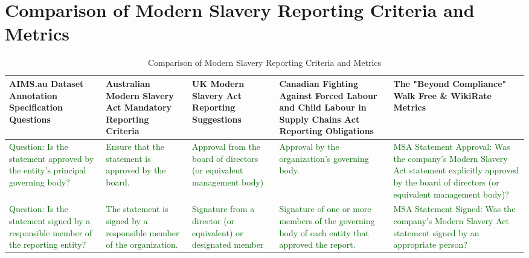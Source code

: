 

\section{Comparison of Modern Slavery Reporting Criteria and Metrics}

\begin{landscape}
\begin{table}
\centering
\caption{Comparison of Modern Slavery Reporting Criteria and Metrics}
\vspace{0.1mm}
\fontsize{7}{7}\selectfont
\label{tab:appendix:examples}
\begin{adjustbox}{scale=0.93}
    \begin{tabularx}{26cm}{|X|X|X|X|X|}
    \hline  %
         \textbf{AIMS.au Dataset Annotation Specification Questions} & \textbf{Australian Modern Slavery Act Mandatory Reporting Criteria} & \textbf{UK Modern Slavery Act Reporting Suggestions} & \textbf{Canadian Fighting Against Forced Labour and Child Labour in Supply Chains Act Reporting Obligations} & \textbf{The "Beyond Compliance" Walk Free \& WikiRate Metrics} \\
    \hline  %

      \textcolor{darkgreen}{  Question: Is the statement approved by the entity's principal governing body?} & \textcolor{darkgreen}{Ensure that the statement is approved by the board.} & \textcolor{darkgreen}{Approval from the board of directors (or equivalent management body)} & \textcolor{darkgreen}{Approval by the organization’s governing body.} & \textcolor{darkgreen}{MSA Statement Approval: Was the company’s Modern Slavery Act statement explicitly approved by the board of directors (or equivalent management body)?} \\
    \hline

         \textcolor{darkgreen}{Question: Is the statement signed by a responsible member of the reporting entity?} & \textcolor{darkgreen}{The statement is signed by a responsible member of the organization. }&\textcolor{darkgreen}{ Signature from a director (or equivalent) or designated member }&\textcolor{darkgreen}{ Signature of one or more members of the governing body of each entity that approved the report.} & \textcolor{darkgreen}{MSA Statement Signed: Was the company’s Modern Slavery Act statement signed by an appropriate person?} \\
    \hline


\end{tabularx}
\end{adjustbox}
\end{table}
\end{landscape}
